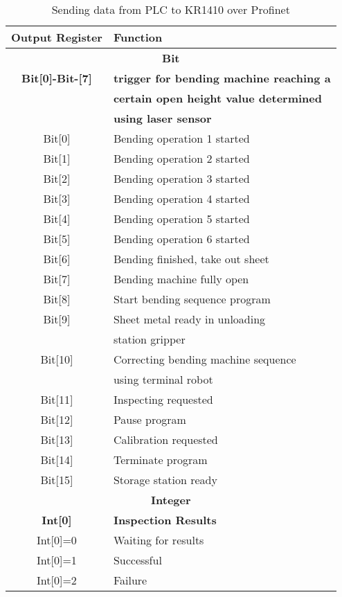 \begin{table}[h!]
  \centering
  \small
  \renewcommand{\arraystretch}{1.2} %
  \begin{tabular}{c@{\hskip 2cm}l}
    \hline
      \textbf{Output Register} & \textbf{Function} \\ \hline
      \multicolumn{2}{c}{\textbf{Bit}} \\ \hline
      \textbf{Bit[0]-Bit-[7]} & \textbf{trigger for bending machine reaching a}\\
      & \textbf{certain open height value determined}\\
      & \textbf{using laser sensor} \\
      Bit[0] & Bending operation 1 started\\
      Bit[1] & Bending operation 2 started\\
      Bit[2] & Bending operation 3 started\\
      Bit[3] & Bending operation 4 started\\
      Bit[4] & Bending operation 5 started\\
      Bit[5] & Bending operation 6 started\\
      Bit[6] & Bending finished, take out sheet\\
      Bit[7] & Bending machine fully open\\
      Bit[8] & Start bending sequence program\\
      Bit[9] & Sheet metal ready in unloading\\
      & station gripper\\
      Bit[10] & Correcting bending machine sequence\\
      & using terminal robot\\
      Bit[11] & Inspecting requested\\
      Bit[12] & Pause program\\
      Bit[13] & Calibration requested\\
      Bit[14] & Terminate program\\
      Bit[15] & Storage station ready\\
      \hline
      \multicolumn{2}{c}{\textbf{Integer}} \\ \hline
      \textbf{Int[0]} & \textbf{Inspection Results}\\
      Int[0]=0 & Waiting for results\\
      Int[0]=1 & Successful\\
      Int[0]=2 & Failure\\
      \hline
  \end{tabular}
  \caption{Sending data from PLC to KR1410 over Profinet}
  \label{tab:plc-to-kr1410}
\end{table}

